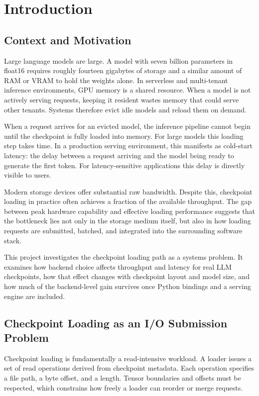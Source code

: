 \chapter{Introduction}
\label{chap:introduction}

\section{Context and Motivation}

Large language models are large. A model with seven billion parameters in float16 requires roughly fourteen gigabytes of storage and a similar amount of RAM or VRAM to hold the weights alone. In serverless and multi-tenant inference environments, GPU memory is a shared resource. When a model is not actively serving requests, keeping it resident wastes memory that could serve other tenants. Systems therefore evict idle models and reload them on demand.

When a request arrives for an evicted model, the inference pipeline cannot begin until the checkpoint is fully loaded into memory. For large models this loading step takes time. In a production serving environment, this manifests as cold-start latency: the delay between a request arriving and the model being ready to generate the first token. For latency-sensitive applications this delay is directly visible to users.

Modern storage devices offer substantial raw bandwidth. Despite this, checkpoint loading in practice often achieves a fraction of the available throughput. The gap between peak hardware capability and effective loading performance suggests that the bottleneck lies not only in the storage medium itself, but also in how loading requests are submitted, batched, and integrated into the surrounding software stack.

This project investigates the checkpoint loading path as a systems problem. It examines how backend choice affects throughput and latency for real LLM checkpoints, how that effect changes with checkpoint layout and model size, and how much of the backend-level gain survives once Python bindings and a serving engine are included.

\section{Checkpoint Loading as an I/O Submission Problem}

Checkpoint loading is fundamentally a read-intensive workload. A loader issues a set of read operations derived from checkpoint metadata. Each operation specifies a file path, a byte offset, and a length. Tensor boundaries and offsets must be respected, which constrains how freely a loader can reorder or merge requests.

